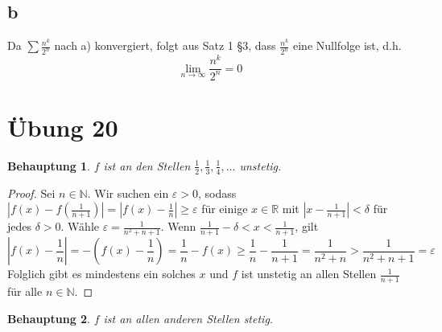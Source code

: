 \documentclass[a4paper,10pt]{article}
\newtheorem{claim}{Behauptung}
\begin{document}
\subsection*{b}

Da $\sum \frac{n^k}{2^n}$ nach a) konvergiert, folgt aus Satz 1 §3, dass $\frac{n^k}{2^n}$ eine Nullfolge ist, d.h.
\begin{equation}
 \lim_{n \rightarrow \infty} \frac{n^k}{2^n} = 0
\end{equation}

\section*{Übung 20}

\begin{claim}
 $f$ ist an den Stellen $\frac{1}{2}, \frac{1}{3}, \frac{1}{4}, \dots$ unstetig.
\end{claim}

\begin{proof}
 Sei $n \in \mathbb{N}$.
 Wir suchen ein $\varepsilon > 0$, sodass $|f(x) - f(\frac{1}{n + 1})| = |f(x) - \frac{1}{n}| \ge \varepsilon$ für einige $x \in \mathbb{R}$ mit $|x - \frac{1}{n + 1}| < \delta$ für jedes $\delta > 0$.
 Wähle $\varepsilon = \frac{1}{n^2 + n + 1}$.
 Wenn $\frac{1}{n + 1} - \delta < x < \frac{1}{n + 1}$, gilt
 \begin{equation}
  |f(x) - \frac{1}{n}| = -(f(x) - \frac{1}{n}) = \frac{1}{n} - f(x) \ge \frac{1}{n} - \frac{1}{n + 1} = \frac{1}{n^2 + n} > \frac{1}{n^2 + n + 1} = \varepsilon
 \end{equation}
 Folglich gibt es mindestens ein solches $x$ und $f$ ist unstetig an allen Stellen $\frac{1}{n + 1}$ für alle $n \in \mathbb{N}$.
\end{proof}

\begin{claim}
 $f$ ist an allen anderen Stellen stetig.
\end{claim}
\end{document}
